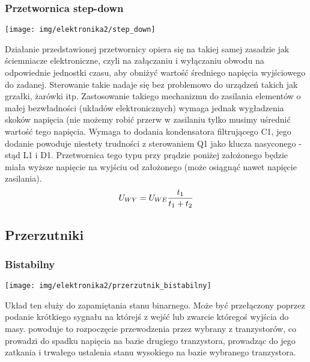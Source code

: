 \documentclass{pdfBooklets}
\begin{document}
\subsubsection{Przetwornica step-down}

\begin{center}\texttt{[image: img/elektronika2/step\_down]}\end{center}

Działanie przedstawionej przetwornicy opiera się na takiej samej zasadzie jak ściemniacze elektroniczne, czyli na załączaniu i wyłączaniu obwodu na odpowiednie jednostki czasu, aby obniżyć wartość średniego napięcia wyjściowego do zadanej.
Sterowanie takie nadaje się bez problemowo do urządzeń takich jak grzałki, żarówki itp.
Zastosowanie takiego mechanizmu do zasilania elementów o małej bezwładności (układów elektronicznych) wymaga jednak wygładzenia skoków napięcia (nie możemy robić przerw w zasilaniu tylko musimy uśrednić wartość tego napięcia.
Wymaga to dodania kondensatora filtrującego C1, jego dodanie powoduje niestety trudności z sterowaniem Q1 jako klucza nasyconego - stąd L1 i D1.
Przetwornica tego typu przy prądzie poniżej założonego będzie miała wyższe napięcie na wyjściu od założonego (może osiągnąć nawet napięcie zasilania).
$$U_{WY} = U_{WE}{t_1 \over t_1 + t_2}$$

\subsection{Przerzutniki}

\subsubsection{Bistabilny}
\begin{center}\texttt{[image: img/elektronika2/przerzutnik\_bistabilny]}\end{center}
Układ ten służy do zapamiętania stanu binarnego. Może być przełączony poprzez podanie krótkiego sygnału na którejś z wejść lub zwarcie któregoś wyjścia do masy.
powoduje to rozpoczęcie przewodzenia przez wybrany z tranzystorów, co prowadzi do spadku napięcia na bazie drugiego tranzystora, prowadząc do jego zatkania i trwałego ustalenia stanu wysokiego na bazie wybranego tranzystora.
\end{document}
